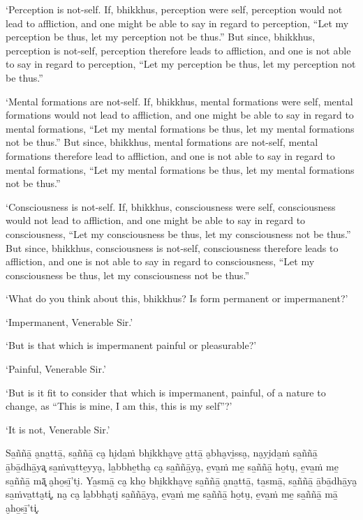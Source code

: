 \clearpage

\englishText
\markboth{\englishTitle}{\rightmark}

‘Perception is not-self. If, bhikkhus, perception were self, perception
would not lead to affliction, and one might be able to say in regard to
perception, “Let my perception be thus, let my perception not be thus.”
But since, bhikkhus, perception is not-self, perception therefore leads
to affliction, and one is not able to say in regard to perception, “Let
my perception be thus, let my perception not be thus.”

‘Mental formations are not-self. If, bhikkhus, mental formations were
self, mental formations would not lead to affliction, and one might be
able to say in regard to mental formations, “Let my mental formations be
thus, let my mental formations not be thus.” But since, bhikkhus, mental
formations are not-self, mental formations therefore lead to affliction,
and one is not able to say in regard to mental formations, “Let my
mental formations be thus, let my mental formations not be thus.”

‘Consciousness is not-self. If, bhikkhus, consciousness were self,
consciousness would not lead to affliction, and one might be able to say
in regard to consciousness, “Let my consciousness be thus, let my
consciousness not be thus.” But since, bhikkhus, consciousness is
not-self, consciousness therefore leads to affliction, and one is not
able to say in regard to consciousness, “Let my consciousness be thus,
let my consciousness not be thus.”

‘What do you think about this, bhikkhus? Is form permanent or
impermanent?’

‘Impermanent, Venerable Sir.’

‘But is that which is impermanent painful or pleasurable?’

‘Painful, Venerable Sir.’

‘But is it fit to consider that which is impermanent, painful, of a
nature to change, as “This is mine, I am this, this is my self”?’

‘It is not, Venerable Sir.’

\clearpage

\paliText
\markboth{\paliTitle}{\rightmark}

Sa̱ññā̱ a̮na̱ttā̱, sa̱ññā̱ ca̮ hi̮da̱ṁ bhi̱kkha̮ve̱ a̱ttā̱ a̮bha̮vi̱ssa̮, na̮yi̮da̱ṁ sa̱ññā̱ ā̱bā̱dhā̱ya͓
sa̱ṁva̱tte̱yya̮, la̱bbhe̱tha̮ ca̮ sa̱ññā̱ya̮, e̱va̱ṁ me̱ sa̱ññā̱ ho̱tu̮, e̱va̱ṁ me̱ sa̱ññā̱ mā͓
a̮ho̱sī̱'ti̮. Ya̱smā̱ ca̮ kho̱ bhi̱kkha̮ve̱ sa̱ññā̱ a̮na̱ttā̱, ta̱smā̱, sa̱ññā̱ ā̱bā̱dhā̱ya̮ sa̱ṁva̱tta̮ti͓,
na̮ ca̮ la̱bbha̮ti̮ sa̱ññā̱ya̮, e̱va̱ṁ me̱ sa̱ññā̱ ho̱tu̮, e̱va̱ṁ me̱ sa̱ññā̱ mā̱ a̮ho̱sī̱'ti͓.

